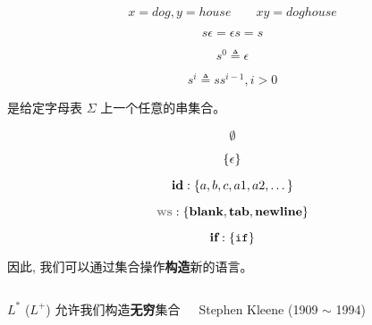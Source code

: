 \begin{frame}{}
  \begin{definition}[串上的``连接''运算]
    \[
      x = dog, y = house \qquad xy = doghouse
    \]

    \[
      s \epsilon = \epsilon s = s
    \]
  \end{definition}

  \pause
  \vspace{0.60cm}
  \begin{definition}[串上的``指数''运算]
    \[
      s^{0} \triangleq \epsilon
    \]

    \[
      s^{i} \triangleq s s^{i-1}, i > 0
    \]
  \end{definition}
\end{frame}

\begin{frame}{}
  \begin{definition}[语言]
    是给定字母表 $\Sigma$ 上一个任意的串集合。
  \end{definition}

  \[
    \emptyset
  \]

  \[
    \set{\epsilon}
  \]

  \pause
  \[
    \id: \set{a, b, c, a1, a2, \dots}
  \]

  \[
    \ws: \set{\blank, \tab, \line}
  \]

  \[
    \ifkw: \set{\texttt{if}}
  \]
\end{frame}

\begin{frame}{}
  \begin{center}

    \vspace{0.80cm}
    因此, 我们可以通过集合操作{\bf 构造}新的语言。
  \end{center}
\end{frame}

\begin{frame}{}
  \begin{columns}

      \begin{center}
        $L^{\ast}$ ($L^{+}$) 允许我们构造{\bf 无穷}集合
      \end{center}
      \begin{center}
        Stephen Kleene (1909 $\sim$ 1994)
      \end{center}
  \end{columns}
\end{frame}

